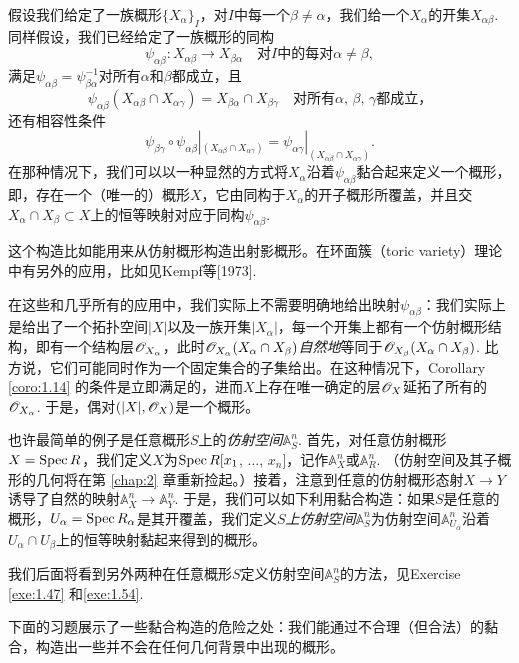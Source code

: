 假设我们给定了一族概形$\{X_\alpha\}_I$，对$I$中每一个$\beta\neq \alpha$，我们给一个$X_\alpha$的开集$X_{\alpha\beta}$. 同样假设，我们已经给定了一族概形的同构
\[
	\psi_{\alpha\beta}:X_{\alpha\beta}\to X_{\beta\alpha}\quad \text{对$I$中的每对$\alpha\neq \beta$},
\]
满足$\psi_{\alpha\beta}=\psi_{\beta\alpha}^{-1}$对所有$\alpha$和$\beta$都成立，且
\[
	\psi_{\alpha\beta}(X_{\alpha\beta}\cap X_{\alpha\gamma})=X_{\beta\alpha}\cap X_{\beta\gamma}\quad \text{对所有$\alpha$, $\beta$, $\gamma$都成立，}
\]
还有相容性条件
\[
	\psi_{\beta\gamma}\circ \psi_{\alpha\beta}|_{(X_{\alpha\beta}\cap X_{\alpha\gamma})}=\psi_{\alpha\gamma}|_{(X_{\alpha\beta}\cap X_{\alpha\gamma})}.
\]
在那种情况下，我们可以以一种显然的方式将$X_\alpha$沿着$\psi_{\alpha\beta}$黏合起来定义一个概形，即，存在一个（唯一的）概形$X$，它由同构于$X_\alpha$的开子概形所覆盖，并且交$X_\alpha\cap X_\beta\subset X$上的恒等映射对应于同构$\psi_{\alpha\beta}$.

这个构造比如能用来从仿射概形构造出射影概形。在环面簇（toric variety）理论中有另外的应用，比如见Kempf等[1973].

在这些和几乎所有的应用中，我们实际上不需要明确地给出映射$\psi_{\alpha\beta}$：我们实际上是给出了一个拓扑空间$|X|$以及一族开集$|X_\alpha|$，每一个开集上都有一个仿射概形结构，即有一个结构层$\mathscr{O}_{X_\alpha}$，此时$\mathscr{O}_{X_\alpha}(X_\alpha\cap X_\beta)$\textit{自然地}等同于$\mathscr{O}_{X_\beta}(X_\alpha\cap X_\beta)$. 比方说，它们可能同时作为一个固定集合的子集给出。在这种情况下，Corollary \ref{coro:1.14} 的条件是立即满足的，进而$X$上存在唯一确定的层$\mathscr{O}_X$延拓了所有的$\mathscr{O}_{X_\alpha}$. 于是，偶对$(|X|,\mathscr{O}_X)$是一个概形。

也许最简单的例子是任意概形$S$上的\textit{仿射空间}$\mathbb{A}^n_S$. 首先，对任意仿射概形$X=\operatorname{Spec} R$，我们定义$X$为$\operatorname{Spec} R[x_1$, $\dots$, $x_n]$，记作$\mathbb{A}_X^n$或$\mathbb{A}_R^n$. （仿射空间及其子概形的几何将在第 \ref{chap:2} 章重新捡起。）接着，注意到任意的仿射概形态射$X\to Y$诱导了自然的映射$\mathbb{A}_X^n\to \mathbb{A}_Y^n$. 于是，我们可以如下利用黏合构造：如果$S$是任意的概形，$U_\alpha=\operatorname{Spec} R_\alpha$是其开覆盖，我们定义\textit{$S$上仿射空间$\mathbb{A}_S^n$}为仿射空间$\mathbb{A}_{U_\alpha}^n$沿着$U_\alpha\cap U_\beta$上的恒等映射黏起来得到的概形。

我们后面将看到另外两种在任意概形$S$定义仿射空间$\mathbb{A}_S^n$的方法，见Exercise \ref{exe:1.47} 和\ref{exe:1.54}.

下面的习题展示了一些黏合构造的危险之处：我们能通过不合理（但合法）的黏合，构造出一些并不会在任何几何背景中出现的概形。

